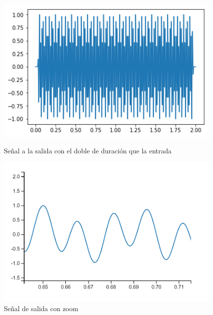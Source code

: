 \documentclass[assd_tp2_main.tex]{subfiles}
\begin{document}
\begin{figure}[H]
\centering
  \begin{minipage}{0.4\textwidth}
    \centering
    \includegraphics[width=1\textwidth]{graficos/EJ6/senodoble.png}
    \caption{Señal a la salida con el doble de duración que la entrada}
    \label{fig:uno}
  \end{minipage}%
  \hspace{5mm}
  \begin{minipage}{0.4\textwidth}
    \centering
    \includegraphics[width=1\textwidth]{graficos/EJ6/senodoblezoom.png}
    \caption{Señal de salida con zoom}
    \label{fig:dos}
  \end{minipage}
\end{figure}
\end{document}
